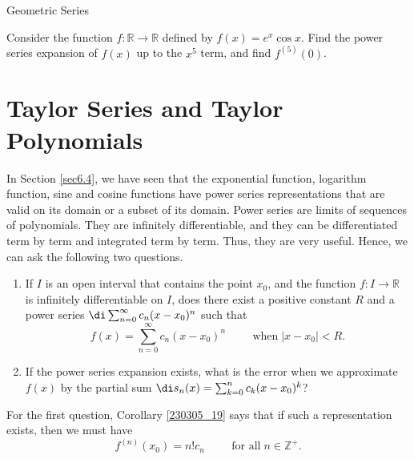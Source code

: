 \begin{example}[label=230305_16]{Geometric Series}
\begin{example}[label=230304_9]{}
\begin{example}{}
\atc
\begin{question}{\themyquestion}
Consider the function $f:\mathbb{R}\to\mathbb{R}$ defined by $f(x)=e^x\cos x$. Find  the power series expansion of $f(x)$ up to the  $x^5$ term, and find $f^{(5)}(0)$. 
\end{question}
\vp


\section{Taylor Series and Taylor Polynomials}\label{sec6.5}
In Section \ref{sec6.4}, we have seen that  the exponential function, logarithm function, sine and cosine functions have power series representations that are valid on its domain or a subset of its domain. Power series are limits of sequences of polynomials. They are infinitely differentiable, and they can be differentiated term by term and integrated term by term. Thus, they are very useful. Hence, we can ask the following two questions.

\begin{highlight}{}
\begin{enumerate}[1.]
\item
If $I$ is an open interval that contains the point $x_0$, and the function $f:I\to\mathbb{R}$ is infinitely differentiable on $I$, does there exist a positive constant $R$ and a power series $\di\sum_{n=0}^{\infty}c_n(x-x_0)^n$ such that
\[f(x)=\sum_{n=0}^{\infty}c_n(x-x_0)^n\hspace{1cm}\text{when}\;|x-x_0|<R.\]
\item If the power series expansion exists, what is the error when we approximate $f(x)$ by the partial sum $\di s_n(x)=\sum_{k=0}^{n}c_k(x-x_0)^k$?

\end{enumerate}
\end{highlight}
For the first question, Corollary \ref{230305_19} says that if such a representation exists, then we must have
\[f^{(n)}(x_0)=n!c_n\hspace{1cm}\text{for all}\; n\in\mathbb{Z}^+.\]


\end{example}
\end{example}
\end{example}
